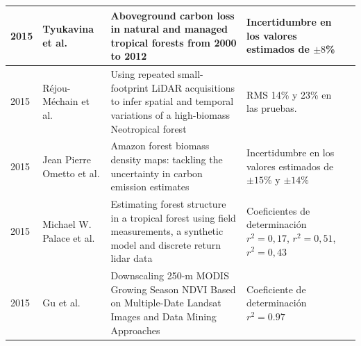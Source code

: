 \documentclass[xcolor=table]{beamer}
\begin{document}
\begin{frame}
\begin{table}
{\begin{tabular}{|p{8cm}|p{8cm}|p{8cm}|p{8cm}|p{8cm}|}
					2015          & Tyukavina et al.                                       & Aboveground carbon loss in natural and managed tropical 	forests from 2000 to 2012                                                                                      & Incertidumbre en los valores estimados de $ \pm 8 $\%                                     \\ \hline
					2015          & R\'ejou-M\'echain et al.                       & Using repeated small-footprint LiDAR acquisitions to infer spatial and temporal variations of a high-biomass Neotropical forest                                        & RMS 14\% y 23\% en las pruebas.                                                          \\ \hline
					2015          & Jean Pierre Ometto et al.                              & Amazon forest biomass density maps: tackling the uncertainty in carbon emission estimates                                                                              & Incertidumbre en los valores estimados de $ \pm 15\% $ y $ \pm 14\% $                     \\ \hline
					2015          & Michael W. Palace et al.                               & Estimating forest structure in a tropical forest using field measurements, a synthetic model and discrete return lidar data                                            & Coeficientes de determinaci\'on $ r^{2}=0,17 $, $ r^{2}=0,51 $, $ r^{2}=0,43 $            \\ \hline
					2015          & Gu et al.                                         & Downscaling 250-m MODIS Growing Season NDVI Based on Multiple-Date Landsat Images and Data Mining Approaches                                                           & Coeficiente de determinaci\'on $ r^{2}=0.97 $                                             \\ \hline		 
				\end{tabular}}
				
			\end{table}
			
			
		\end{frame}
		
\end{document}
